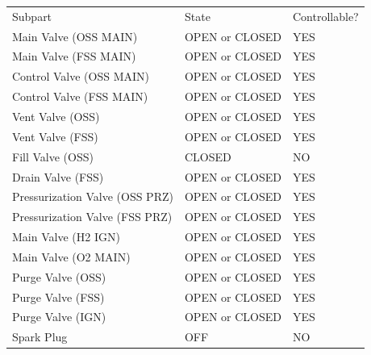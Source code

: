 \documentclass{article}
\begin{document}
\begin{tabularx}{0.9\textwidth}{|>{\columncolor{tableColumnColor}}X|X|X|}
    \hline
    \rowcolor{tableHeaderColor} \multicolumn{3}{|c|}{\large{FIRING ARMED}} \\ \hline
    \rowcolor{tableHeaderColor} Subpart & State & Controllable? \\ \hline
    Main Valve (OSS MAIN) & OPEN or CLOSED & \cellcolor{green} YES \\ \hline
    Main Valve (FSS MAIN) & OPEN or CLOSED & \cellcolor{green} YES \\ \hline
    Control Valve (OSS MAIN) & OPEN or CLOSED & \cellcolor{green} YES \\ \hline
    Control Valve (FSS MAIN) & OPEN or CLOSED & \cellcolor{green} YES \\ \hline
    Vent Valve (OSS) & OPEN or CLOSED & \cellcolor{green} YES \\ \hline
    Vent Valve (FSS) & OPEN or CLOSED & \cellcolor{green} YES \\ \hline
    Fill Valve (OSS) & CLOSED & \cellcolor{red} NO \\ \hline
    Drain Valve (FSS) & OPEN or CLOSED & \cellcolor{green} YES \\ \hline
    Pressurization Valve (OSS PRZ) & OPEN or CLOSED & \cellcolor{green} YES \\ \hline
    Pressurization Valve (FSS PRZ) & OPEN or CLOSED & \cellcolor{green} YES \\ \hline
    Main Valve (H2 IGN) & OPEN or CLOSED & \cellcolor{green} YES \\ \hline
    Main Valve (O2 MAIN) & OPEN or CLOSED & \cellcolor{green} YES \\ \hline
    Purge Valve (OSS) & OPEN or CLOSED & \cellcolor{green} YES \\ \hline
    Purge Valve (FSS) & OPEN or CLOSED & \cellcolor{green} YES \\ \hline
    Purge Valve (IGN) & OPEN or CLOSED & \cellcolor{green} YES \\ \hline
    Spark Plug & OFF & \cellcolor{red} NO \\ \hline
\end{tabularx}
\newpage
\end{document}
